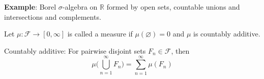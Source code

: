 \documentclass[12pt]{article}
\let\emptyset\varnothing
\begin{document}
\textbf{Example}: Borel $\sigma$-algebra on $\mathbb{R}$ formed by open sets, countable unions and intersections and complements.

\noindent Let $\mu: \mathcal{F} \rightarrow [0,\infty]$ is called a measure if $\mu(\emptyset)=0$ and $\mu$ is countably additive. 

Countably additive: For pairwise disjoint sets $F_n \in \mathcal{F}$, then 
$$ \mu\Big( \bigcup^\infty_{n=1} F_n\Big) = \sum^\infty_{n=1} \mu (F_n)$$
\end{document}
